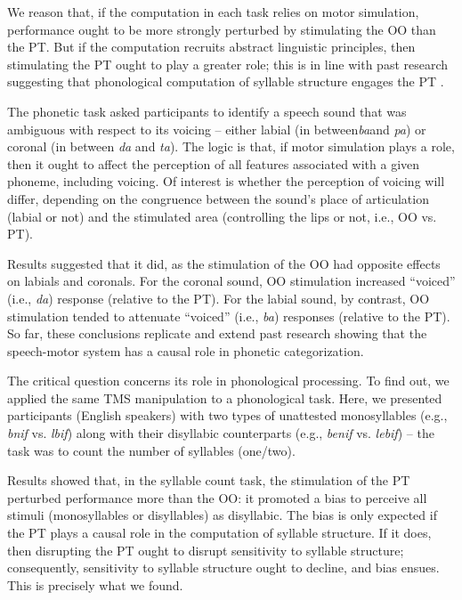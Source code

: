 \documentclass[output=paper,colorlinks,citecolor=brown
]{langscibook}
\begin{document}
We reason that, if the computation in each task relies on motor simulation, performance ought to be more strongly perturbed by stimulating the OO than the PT. But if the computation recruits abstract linguistic principles, then stimulating the PT ought to play a greater role; this is in line with past research suggesting that phonological computation of syllable structure engages the PT \citep{berent2014language}.

The phonetic task asked participants to identify a speech sound that was ambiguous with respect to its voicing -- either labial (in between\textit{ba}and \textit{pa}) or coronal (in between \textit{da} and \textit{ta}). The logic is that, if motor simulation plays a role, then it ought to affect the perception of all features associated with a given phoneme, including voicing. Of interest is whether the perception of voicing will differ, depending on the congruence between the sound’s place of articulation (labial or not) and the stimulated area (controlling the lips or not, i.e., OO vs. PT). 

Results suggested that it did, as the stimulation of the OO had opposite effects on labials and coronals. For the coronal sound, OO stimulation increased “voiced” (i.e., \textit{da}) response (relative to the PT). For the labial sound, by contrast, OO stimulation tended to attenuate “voiced” (i.e., \textit{ba}) responses (relative to the PT). So far, these conclusions replicate and extend past research showing that the speech-motor system has a causal role in phonetic categorization.

The critical question concerns its role in phonological processing. To find out, we applied the same TMS manipulation to a phonological task. Here, we presented participants (English speakers) with two types of unattested monosyllables (e.g., \textit{bnif} vs. \textit{lbif}) along with their disyllabic counterparts (e.g., \textit{benif} vs. \textit{lebif}) -- the task was to count the number of syllables (one/two). 

Results showed that, in the syllable count task, the stimulation of the PT perturbed performance more than the OO: it promoted a bias to perceive all stimuli (monosyllables or disyllables) as disyllabic. The bias is only expected if the PT plays a causal role in the computation of syllable structure. If it does, then disrupting the PT ought to disrupt sensitivity to syllable structure; consequently, sensitivity to syllable structure ought to decline, and bias ensues. This is precisely what we found.
\end{document}
